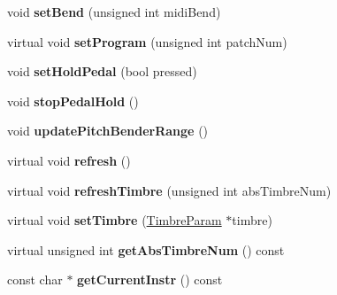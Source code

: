 \begin{DoxyCompactItemize}
\item 
\hypertarget{classMT32Emu_1_1Part_a6cb98addec3e2fd600d7e8c6266e23ab}{void {\bfseries set\-Bend} (unsigned int midi\-Bend)}\label{classMT32Emu_1_1Part_a6cb98addec3e2fd600d7e8c6266e23ab}

\item 
\hypertarget{classMT32Emu_1_1Part_a47a373cdb17b7a7e5dc6bcd234eaf0a1}{virtual void {\bfseries set\-Program} (unsigned int patch\-Num)}\label{classMT32Emu_1_1Part_a47a373cdb17b7a7e5dc6bcd234eaf0a1}

\item 
\hypertarget{classMT32Emu_1_1Part_ab13a8707c411696ca41666d84d42c173}{void {\bfseries set\-Hold\-Pedal} (bool pressed)}\label{classMT32Emu_1_1Part_ab13a8707c411696ca41666d84d42c173}

\item 
\hypertarget{classMT32Emu_1_1Part_aa94b4fcccbfc1f9effa025ea977df5f5}{void {\bfseries stop\-Pedal\-Hold} ()}\label{classMT32Emu_1_1Part_aa94b4fcccbfc1f9effa025ea977df5f5}

\item 
\hypertarget{classMT32Emu_1_1Part_a04be83433139bbe7077236c1afea5ca1}{void {\bfseries update\-Pitch\-Bender\-Range} ()}\label{classMT32Emu_1_1Part_a04be83433139bbe7077236c1afea5ca1}

\item 
\hypertarget{classMT32Emu_1_1Part_a8d67fa2ca27ba524c60e1f85ae72ca89}{virtual void {\bfseries refresh} ()}\label{classMT32Emu_1_1Part_a8d67fa2ca27ba524c60e1f85ae72ca89}

\item 
\hypertarget{classMT32Emu_1_1Part_a5e77f7cd7fa307b1aec5859eb5a008c2}{virtual void {\bfseries refresh\-Timbre} (unsigned int abs\-Timbre\-Num)}\label{classMT32Emu_1_1Part_a5e77f7cd7fa307b1aec5859eb5a008c2}

\item 
\hypertarget{classMT32Emu_1_1Part_a8455bea938f39c33e0ee782aba15c351}{virtual void {\bfseries set\-Timbre} (\hyperlink{structMT32Emu_1_1TimbreParam}{Timbre\-Param} $\ast$timbre)}\label{classMT32Emu_1_1Part_a8455bea938f39c33e0ee782aba15c351}

\item 
\hypertarget{classMT32Emu_1_1Part_aa666ae05d59af098a7062c0afe6b5568}{virtual unsigned int {\bfseries get\-Abs\-Timbre\-Num} () const }\label{classMT32Emu_1_1Part_aa666ae05d59af098a7062c0afe6b5568}

\item 
\hypertarget{classMT32Emu_1_1Part_a145fa6020b942a51c3c9e2aaa94835d6}{const char $\ast$ {\bfseries get\-Current\-Instr} () const }\label{classMT32Emu_1_1Part_a145fa6020b942a51c3c9e2aaa94835d6}


\end{DoxyCompactItemize}
